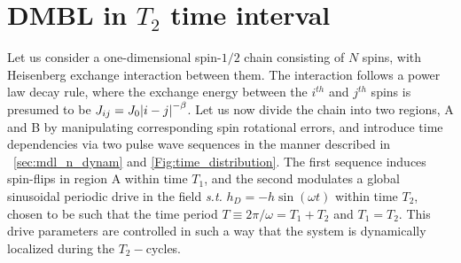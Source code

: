 \documentclass[12pt]{iopart}
\providecommand{\DIFaddtex}[1]{{\protect\color{red}\uwave{#1}}} %
\providecommand{\DIFdeltex}[1]{{}}                      %
\providecommand{\DIFaddbegin}{} %
\providecommand{\DIFaddend}{} %
\providecommand{\DIFdelbegin}{} %
\providecommand{\DIFdelend}{} %
\providecommand{\DIFadd}[1]{\texorpdfstring{\DIFaddtex{#1}}{#1}} %
\providecommand{\DIFdel}[1]{\texorpdfstring{\DIFdeltex{#1}}{}} %
\newcommand{\DIFscaledelfig}{0.5}
\newlength{\DIFdelgraphicswidth} %
\newlength{\DIFdelgraphicsheight} %
\newcommand{\DIFaddincludegraphics}[2][]{{\color{blue}\fbox{\DIFOincludegraphics[#1]{#2}}}} %
\newcommand{\DIFdelincludegraphics}[2][]{%
\sbox{\DIFdelgraphicsbox}{\DIFOincludegraphics[#1]{#2}}%
\settoboxwidth{\DIFdelgraphicswidth}{\DIFdelgraphicsbox} %
\settoboxtotalheight{\DIFdelgraphicsheight}{\DIFdelgraphicsbox} %
\scalebox{\DIFscaledelfig}{%
\parbox[b]{\DIFdelgraphicswidth}{\usebox{\DIFdelgraphicsbox}\\[-\baselineskip] \rule{\DIFdelgraphicswidth}{0em}}\llap{\resizebox{\DIFdelgraphicswidth}{\DIFdelgraphicsheight}{%
\setlength{\unitlength}{\DIFdelgraphicswidth}%
\begin{picture}(1,1)%
\thicklines\linethickness{2pt} %
{\color[rgb]{1,0,0}\put(0,0){\framebox(1,1){}}}%
{\color[rgb]{1,0,0}\put(0,0){\line( 1,1){1}}}%
{\color[rgb]{1,0,0}\put(0,1){\line(1,-1){1}}}%
\end{picture}%
}\hspace*{3pt}}} %
} %
\DeclareRobustCommand{\DIFaddbegin}{\DIFOaddbegin \let\includegraphics\DIFaddincludegraphics} %
\DeclareRobustCommand{\DIFaddend}{\DIFOaddend \let\includegraphics\DIFOincludegraphics} %
\DeclareRobustCommand{\DIFdelbegin}{\DIFOdelbegin \let\includegraphics\DIFdelincludegraphics} %
\DeclareRobustCommand{\DIFdelend}{\DIFOaddend \let\includegraphics\DIFOincludegraphics} %
\begin{document}
\clearpage

\appendix
\section{\label{sec:AppendixA} DMBL in $T_2$ time interval}

Let us consider a one-dimensional spin-$1/2$ chain consisting of $N$ spins, with Heisenberg exchange interaction between them. The interaction follows a power law decay rule, where the exchange energy between the $i^{th}$ and $j^{th}$ spins is presumed to be  $J_{ij}=J_0\abs{i-j}^{-\beta}$. Let us now  divide the chain into two regions, A and B by manipulating corresponding spin rotational errors, and introduce time dependencies via two pulse wave sequences in the manner described in \DIFdelbegin \DIFdel{Sec.}\DIFdelend \DIFaddbegin \DIFadd{section}\DIFaddend ~\ref{sec:mdl_n_dynam} and \DIFdelbegin \DIFdel{Fig }\DIFdelend \DIFaddbegin \DIFadd{figure~}\DIFaddend \ref{Fig:time_distribution}. The first sequence  induces spin-flips in region A within time $T_1$, and the second modulates a global sinusoidal periodic drive in the field \textit{s.t.} $h_D = -h\sin(\omega t)$ within time $T_2$, chosen to be such that the time period $T\equiv 2\pi/\omega = T_1 + T_2$ and $T_1 = T_2$. This drive parameters are controlled in such a way that the system is dynamically localized during the $T_2-$cycles.
\end{document}
